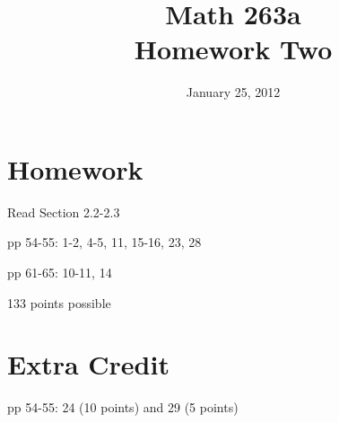 \documentclass{exam}
\title{Math 263a \\ Homework Two}
\date{January 25, 2012}
\begin{document}
\maketitle

\section{Homework}

\begin{itemize*}
  \item Read Section 2.2-2.3
  \item pp 54-55: 1-2, 4-5, 11, 15-16, 23, 28
  \item pp 61-65: 10-11, 14
\end{itemize*}

133 points possible

\section{Extra Credit}

pp 54-55: 24 (10 points) and 29 (5 points)
\end{document}
